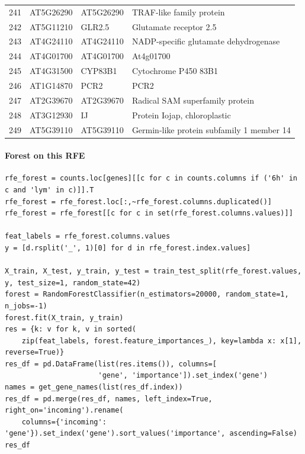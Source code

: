\documentclass[11pt]{article}
\begin{document}
\begin{center}
\begin{tabular}{rlll}
241 & AT5G26290 & AT5G26290 & TRAF-like family protein\\
242 & AT5G11210 & GLR2.5 & Glutamate receptor 2.5\\
243 & AT4G24110 & AT4G24110 & NADP-specific glutamate dehydrogenase\\
244 & AT4G01700 & AT4G01700 & At4g01700\\
245 & AT4G31500 & CYP83B1 & Cytochrome P450 83B1\\
246 & AT1G14870 & PCR2 & PCR2\\
247 & AT2G39670 & AT2G39670 & Radical SAM superfamily protein\\
248 & AT3G12930 & IJ & Protein Iojap, chloroplastic\\
249 & AT5G39110 & AT5G39110 & Germin-like protein subfamily 1 member 14\\
\end{tabular}
\end{center}


\paragraph{Forest on this RFE}
\label{sec:org38e734e}

\begin{verbatim}
rfe_forest = counts.loc[genes][[c for c in counts.columns if ('6h' in c and 'lym' in c)]].T
rfe_forest = rfe_forest.loc[:,~rfe_forest.columns.duplicated()]
rfe_forest = rfe_forest[[c for c in set(rfe_forest.columns.values)]]

feat_labels = rfe_forest.columns.values
y = [d.rsplit('_', 1)[0] for d in rfe_forest.index.values]

X_train, X_test, y_train, y_test = train_test_split(rfe_forest.values, y, test_size=1, random_state=42)
forest = RandomForestClassifier(n_estimators=20000, random_state=1, n_jobs=-1)
forest.fit(X_train, y_train)
res = {k: v for k, v in sorted(
    zip(feat_labels, forest.feature_importances_), key=lambda x: x[1], reverse=True)}
res_df = pd.DataFrame(list(res.items()), columns=[
                      'gene', 'importance']).set_index('gene')
names = get_gene_names(list(res_df.index))
res_df = pd.merge(res_df, names, left_index=True, right_on='incoming').rename(
    columns={'incoming': 'gene'}).set_index('gene').sort_values('importance', ascending=False)
res_df
\end{verbatim}
\end{document}

